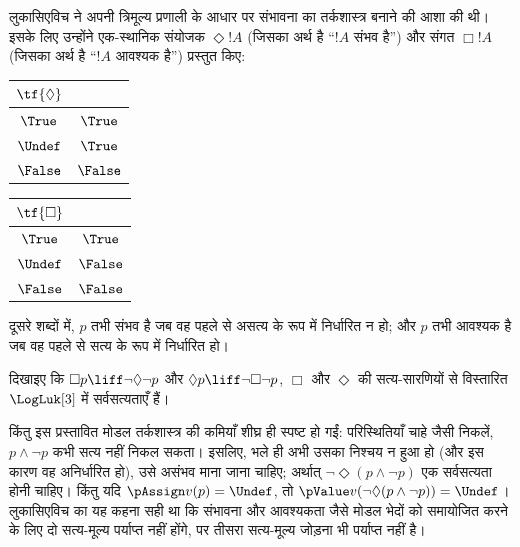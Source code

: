 \documentclass[../../../include/open-logic-section]{subfiles}
\begin{document}
लुकासिएविच ने अपनी त्रिमूल्य प्रणाली के आधार पर संभावना का तर्कशास्त्र
बनाने की आशा की थी। इसके लिए उन्होंने एक-स्थानिक संयोजक $\Diamond !A$
(जिसका अर्थ है ``$!A$ संभव है'') और संगत $\Box !A$ (जिसका अर्थ है
``$!A$ आवश्यक है'') प्रस्तुत किए:
\begin{center}
  \begin{tabular}{c|c} 
    $\tf{\Diamond}$ & \\ 
    \hline  
    $\True$ & $\True$ \\ 
    $\Undef$ & $\True$ \\
    $\False$ & $\False$ 
  \end{tabular}
  \quad
  \begin{tabular}{c|c} 
    $\tf{\Box}$ & \\ 
    \hline  
    $\True$ & $\True$ \\ 
    $\Undef$ & $\False$ \\
    $\False$ & $\False$ 
  \end{tabular}
\end{center}
दूसरे शब्दों में, $p$ तभी संभव है जब वह पहले से असत्य के रूप में निर्धारित
न हो; और $p$ तभी आवश्यक है जब वह पहले से सत्य के रूप में निर्धारित हो।

\begin{prob}
  दिखाइए कि $\Box p \liff \lnot\Diamond \lnot p$ और $\Diamond p \liff
  \lnot \Box \lnot p$, $\Box$ और $\Diamond$ की सत्य-सारणियों से विस्तारित
  $\LogLuk[3]$ में सर्वसत्यताएँ हैं।
\end{prob}

किंतु इस प्रस्तावित मोडल तर्कशास्त्र की कमियाँ शीघ्र ही स्पष्ट हो गईं:
परिस्थितियाँ चाहे जैसी निकलें, $p \land \lnot p$ कभी सत्य नहीं निकल सकता।
इसलिए, भले ही अभी उसका निश्चय न हुआ हो (और इस कारण वह अनिर्धारित हो), उसे
असंभव माना जाना चाहिए; अर्थात् $\lnot \Diamond(p \land \lnot p)$ एक
सर्वसत्यता होनी चाहिए। किंतु यदि $\pAssign v(p) = \Undef$, तो
$\pValue v(\lnot \Diamond(p \land \lnot p)) = \Undef$। लुकासिएविच का यह
कहना सही था कि संभावना और आवश्यकता जैसे मोडल भेदों को समायोजित करने के लिए
दो सत्य-मूल्य पर्याप्त नहीं होंगे, पर तीसरा सत्य-मूल्य जोड़ना भी पर्याप्त
नहीं है।
\end{document}
